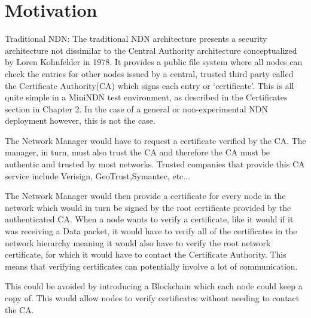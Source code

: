 \section{Motivation}
Traditional NDN: The traditional NDN architecture presents a security architecture not dissimilar to the Central Authority architecture conceptualized by Loren Kohnfelder in 1978\cite{04}. It provides a public file\cite{05} system where all nodes can check the entries for other nodes issued by a central, trusted third party called the Certificate Authority(CA) which signs each entry or `certificate'. This is all quite simple in a MiniNDN test environment, as described in the Certificates section in Chapter 2. In the case of a general or non-experimental NDN deployment\cite{06} however, this is not the case.\par 
The Network Manager would have to request a certificate verified by the CA. The manager, in turn, must also trust the CA and therefore the CA must be authentic and trusted by most networks. Trusted companies that provide this CA service include Verisign, GeoTrust,Symantec, etc... \par
The Network Manager would then provide a certificate for every node in the network which would in turn be signed by the root certificate provided by the authenticated CA. When a node wants to verify a certificate, like it would if it was receiving a Data packet, it would have to verify all of the certificates in the network hierarchy meaning it would also have to verify the root network certificate, for which it would have to contact the Certificate Authority. This means that verifying certificates can potentially involve a lot of communication.\par 
This could be avoided by introducing a Blockchain which each node could keep a copy of. This would allow nodes to verify certificates without needing to contact the CA.

